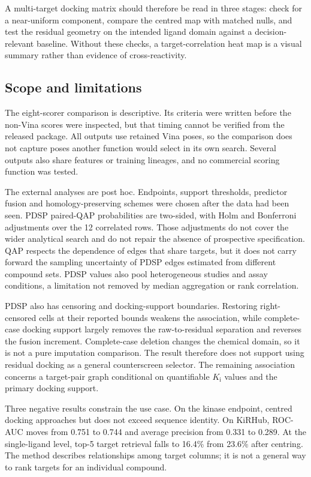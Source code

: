 A multi-target docking matrix should therefore be read in three stages: check for a near-uniform
component, compare the centred map with matched nulls, and test the residual geometry on the intended
ligand domain against a decision-relevant baseline. Without these checks, a target-correlation heat
map is a visual summary rather than evidence of cross-reactivity.

\subsection{Scope and limitations}

The eight-scorer comparison is descriptive. Its criteria were written before the non-Vina scores
were inspected, but that timing cannot be verified from the released package. All outputs use
retained Vina poses, so the comparison does not capture poses another function would select in its
own search. Several outputs also share features or training lineages, and no commercial scoring
function was tested.

The external analyses are post hoc. Endpoints, support thresholds, predictor fusion and
homology-preserving schemes were chosen after the data had been seen. PDSP paired-QAP probabilities
are two-sided, with Holm and Bonferroni adjustments over the 12 correlated rows. Those adjustments
do not cover the wider analytical search and do not repair the absence of prospective specification.
QAP respects the dependence of edges that share targets, but it does not carry forward the sampling
uncertainty of PDSP edges estimated from different compound sets.
PDSP values also pool heterogeneous studies and assay conditions, a limitation not removed by
median aggregation or rank correlation.

PDSP also has censoring and docking-support boundaries. Restoring right-censored cells at their
reported bounds weakens the association, while complete-case docking support largely removes the
raw-to-residual separation and reverses the fusion increment. Complete-case deletion changes the
chemical domain, so it is not a pure imputation comparison. The result therefore does not support
using residual docking as a general counterscreen selector. The remaining association concerns a
target-pair graph conditional on quantifiable $K_\text{i}$ values and the primary docking support.

Three negative results constrain the use case. On the kinase endpoint, centred docking approaches
but does not exceed sequence identity. On KiRHub, ROC-AUC moves from 0.751 to 0.744 and average
precision from 0.331 to 0.289. At the single-ligand level, top-5 target retrieval falls to 16.4\%
from 23.6\% after centring. The method describes relationships among target columns; it is not a
general way to rank targets for an individual compound.

